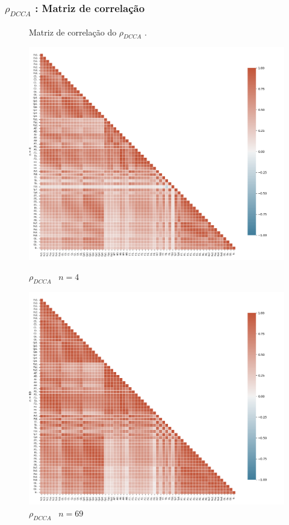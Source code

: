 \documentclass[11pt, aspectratio=169]{beamer}
\newcommand{\pdcca}{\({\rho}_{DCCA}\) }
\begin{document}
\begin{frame}
\frametitle{\pdcca: Matriz de correlação}
\begin{figure}[ht]
  \caption{Matriz de correlação do \pdcca.}
  \begin{minipage}[b]{0.45\textwidth}
    \includegraphics[width=\textwidth]{../Figures/test_dmc/pdcca4.png}
    \caption{\pdcca~$n = 4$}
  \end{minipage}
  \hfill
  \begin{minipage}[b]{0.45\textwidth}
    \includegraphics[width=\textwidth]{../Figures/test_dmc/pdcca69.png}
    \caption{\pdcca~$n = 69$}
  \end{minipage}
\end{figure}
\end{frame}
\end{document}

